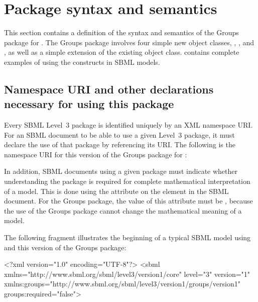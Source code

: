 
\section{Package syntax and semantics}
\label{sec:syntax}

This section contains a definition of the syntax and semantics of the Groups package for \sbmlthreecore.  The Groups package involves four simple new object classes, \Group, \Member, \ListOfMembers and \ListOfGroups, as well as a simple extension of the existing \Model object class.   contains complete examples of using the constructs in SBML models.

\subsection{Namespace URI and other declarations necessary for using this package}
\label{xml-namespace}

Every SBML Level~3 package is identified uniquely by an XML namespace URI.  For an SBML document to be able to use a given Level~3 package, it must declare the use of that package by referencing its URI.  The following is the namespace URI for this version of the Groups package for \sbmlthreecore:
\begin{center}
\end{center}

In addition, SBML documents using a given package must indicate whether understanding the package is required for complete mathematical interpretation of a model.  This is done using the attribute  on the  element in the SBML document.  For the Groups package, the value of this attribute must be , because the use of the Groups package cannot change the mathematical meaning of a model.

The following fragment illustrates the beginning of a typical SBML model using \sbmlthreecore and this version of the Groups package:

\begin{example}
<?xml version="1.0" encoding="UTF-8"?>
<sbml xmlns="http://www.sbml.org/sbml/level3/version1/core" level="3" version="1"
      xmlns:groups="http://www.sbml.org/sbml/level3/version1/groups/version1"
      groups:required="false">
\end{example}


